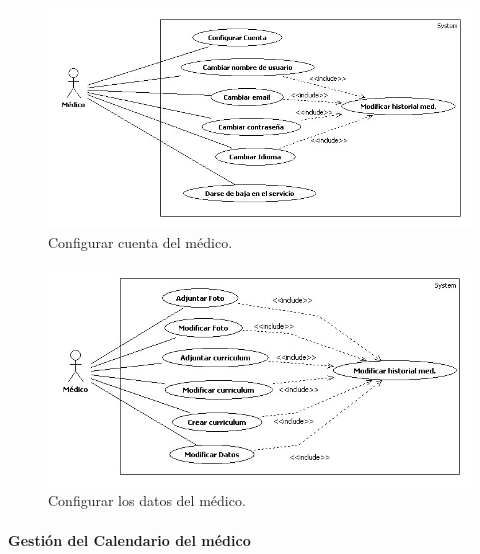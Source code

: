 					\begin{figure}[H]
					  \centering
					    \includegraphics[width=15cm]{img/jpg/casos_uso/Configurar_Cuenta_Medico.jpg}
					  \caption{Configurar cuenta del médico.}
					  \label{fig:config_med_cuenta}
					\end{figure}

					\bigskip

					\begin{figure}[H]
					  \centering
					    \includegraphics[width=15cm]{img/jpg/casos_uso/Configurar_Datos_Medico.jpg}
					  \caption{Configurar los datos del médico.}
					  \label{fig:config_med_datos}
					\end{figure}

				\bigskip
				\bigskip
				\paragraph{Gestión del Calendario del médico} %
				\label{par:gestion_del_calendario_del_medico}

